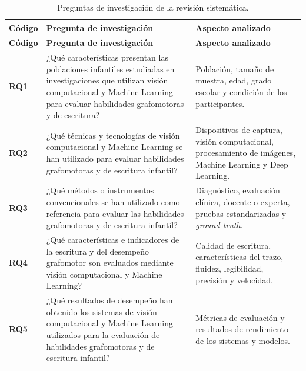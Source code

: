 \documentclass{iaesarticle}
\begin{document}
\begin{longtable}{%
    |>{\centering\arraybackslash}p{}%
    |>{\raggedright\arraybackslash}p{}%
    |>{\raggedright\arraybackslash}p{}|}
\caption{Preguntas de investigación de la revisión sistemática.}
\label{tab:preguntas-investigacion}\\
\hline
\rowcolor{blue!10}
\textbf{Código} &
\textbf{Pregunta de investigación} &
\textbf{Aspecto analizado} \\
\hline
\endfirsthead

\hline
\rowcolor{blue!10}
\textbf{Código} &
\textbf{Pregunta de investigación} &
\textbf{Aspecto analizado} \\
\hline
\endhead

\hline
\endfoot

\hline
\endlastfoot

\scriptsize

\textbf{RQ1} &
¿Qué características presentan las poblaciones infantiles estudiadas en investigaciones que utilizan visión computacional y Machine Learning para evaluar habilidades grafomotoras y de escritura? &
Población, tamaño de muestra, edad, grado escolar y condición de los participantes. \\
\hline

\textbf{RQ2} &
¿Qué técnicas y tecnologías de visión computacional y Machine Learning se han utilizado para evaluar habilidades grafomotoras y de escritura infantil? &
Dispositivos de captura, visión computacional, procesamiento de imágenes, Machine Learning y Deep Learning. \\
\hline

\textbf{RQ3} &
¿Qué métodos o instrumentos convencionales se han utilizado como referencia para evaluar las habilidades grafomotoras y de escritura infantil? &
Diagnóstico, evaluación clínica, docente o experta, pruebas estandarizadas y \textit{ground truth}. \\
\hline

\textbf{RQ4} &
¿Qué características e indicadores de la escritura y del desempeño grafomotor son evaluados mediante visión computacional y Machine Learning? &
Calidad de escritura, características del trazo, fluidez, legibilidad, precisión y velocidad. \\
\hline

\textbf{RQ5} &
¿Qué resultados de desempeño han obtenido los sistemas de visión computacional y Machine Learning utilizados para la evaluación de habilidades grafomotoras y de escritura infantil? &
Métricas de evaluación y resultados de rendimiento de los sistemas y modelos. \\
\hline

\end{longtable}
\end{document}
